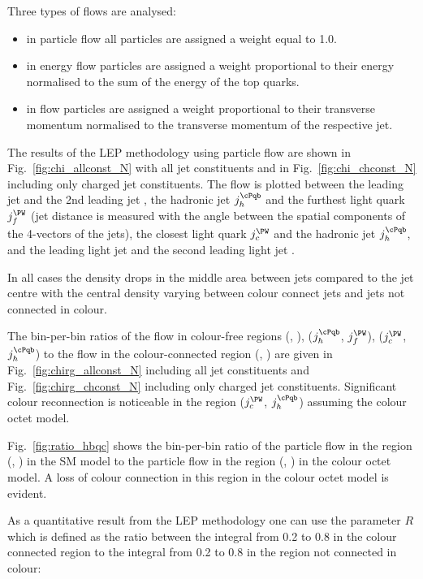 \label{sec:LEP_methodology}

Three types of flows are analysed:
\begin{itemize}
\item in particle flow all particles are assigned a weight equal to 1.0.
\item in energy flow particles are assigned a weight proportional to their energy normalised to the sum of the energy of the top quarks.
\item in \pt flow particles are assigned a weight proportional to their transverse momentum normalised to the transverse momentum of the respective jet.
\end{itemize}

The results of the LEP methodology using particle flow are shown in Fig.~\ref{fig:chi_allconst_N} with all jet constituents and in Fig.~\ref{fig:chi_chconst_N} including only charged jet constituents. The flow is plotted between the leading \cPqb jet \leadingb and the 2nd leading \cPqb jet \scndleadingb, the hadronic \cPqb jet $j_{h}^{\cPqb}$ and the furthest light quark $j_{f}^{\PW}$ (jet distance is measured with the angle between the spatial components of the 4-vectors of the jets), the closest light quark $j_{c}^{\PW}$ and the hadronic \cPqb jet $j_{h}^{\cPqb}$, and the leading light jet \leadingjet and the second leading light jet \scndleadingjet.

In all cases the density drops in the middle area between jets compared to the jet centre with the central density varying between colour connect jets and jets not connected in colour.

The bin-per-bin ratios of the flow in colour-free regions (\leadingb, \scndleadingb), ($j_{h}^{\cPqb}$, $j_{f}^{\PW}$), ($j_{c}^{\PW}$, $j_{h}^{\cPqb}$) to the flow in the colour-connected region (\leadingjet, \scndleadingjet) are given in Fig.~\ref{fig:chirg_allconst_N} including all jet constituents and Fig.~\ref{fig:chirg_chconst_N} including only charged jet constituents. Significant colour reconnection is noticeable in the region ($j_{c}^{\PW}$, $j_{h}^{\cPqb}$) assuming the colour octet \PW model.

Fig.~\ref{fig:ratio_hbqc} shows the bin-per-bin ratio of the particle flow in the region (\leadingjet, \scndleadingjet) in the SM model to the particle flow in the region (\leadingjet, \scndleadingjet) in the colour octet \PW model. A loss of colour connection in this region in the colour octet \PW model is evident.

As a quantitative result from the LEP methodology one can use the parameter $R$ which is defined as the ratio between the integral from 0.2 to 0.8 in the colour connected region to the integral from 0.2 to 0.8 in the region not connected in colour:

